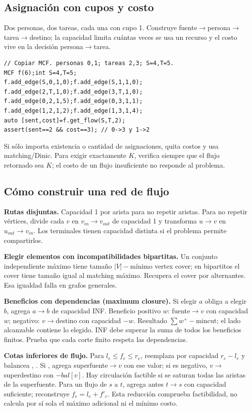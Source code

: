 \subsection{Asignación con cupos y costo}
Dos personas, dos tareas, cada una con cupo 1. Construye fuente$\to$persona$\to$tarea$\to$destino; la capacidad limita cuántas veces se usa un recurso y el costo vive en la decisión persona$\to$tarea.
\begin{lstlisting}
// Copiar MCF. personas 0,1; tareas 2,3; S=4,T=5.
MCF f(6);int S=4,T=5;
f.add_edge(S,0,1,0);f.add_edge(S,1,1,0);
f.add_edge(2,T,1,0);f.add_edge(3,T,1,0);
f.add_edge(0,2,1,5);f.add_edge(0,3,1,1);
f.add_edge(1,2,1,2);f.add_edge(1,3,1,4);
auto [sent,cost]=f.get_flow(S,T,2);
assert(sent==2 && cost==3); // 0->3 y 1->2
\end{lstlisting}
Si sólo importa existencia o cantidad de asignaciones, quita costos y usa matching/Dinic. Para exigir exactamente $K$, verifica siempre que el flujo retornado sea $K$; el costo de un flujo insuficiente no responde al problema.

\subsection{Cómo construir una red de flujo}
\textbf{Rutas disjuntas.} Capacidad 1 por arista para no repetir aristas. Para no repetir vértices, divide cada $v$ en $v_{in}\to v_{out}$ de capacidad 1 y transforma $u\to v$ en $u_{out}\to v_{in}$. Los terminales tienen capacidad distinta si el problema permite compartirlos.

\textbf{Elegir elementos con incompatibilidades bipartitas.} Un conjunto independiente máximo tiene tamaño $|V|-$mínimo vertex cover; en bipartitos el cover tiene tamaño igual al matching máximo. Recupera el cover por alternantes. Esa igualdad falla en grafos generales.

\textbf{Beneficios con dependencias (maximum closure).} Si elegir $a$ obliga a elegir $b$, agrega $a\to b$ de capacidad INF. Beneficio positivo $w$: fuente$\to v$ con capacidad $w$; negativo: $v\to$destino con capacidad $-w$. Resultado $\sum w^+-$mincut; el lado alcanzable contiene lo elegido. INF debe superar la suma de todos los beneficios finitos. Prueba que cada corte finito respeta las dependencias.

\textbf{Cotas inferiores de flujo.} Para $l_e\le f_e\le r_e$, reemplaza por capacidad $r_e-l_e$ y balancea , . Si , agrega superfuente$\to v$ con ese valor; si es negativo, $v\to$superdestino con $-bal[v]$. Hay circulación factible si se saturan todas las aristas de la superfuente. Para un flujo de $s$ a $t$, agrega antes $t\to s$ con capacidad suficiente; reconstruye $f_e=l_e+f'_e$. Esta reducción comprueba factibilidad, no calcula por sí sola el máximo adicional ni el mínimo costo.

